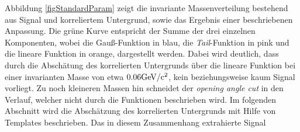 \newline
Abbildung \ref{figStandardParam} zeigt die invariante Massenverteilung bestehend aus Signal und korreliertem Untergrund, sowie das Ergebnis einer beschriebenen Anpassung.
Die gr\"une Kurve entspricht der Summe der drei einzelnen Komponenten, wobei die Gau{\ss}-Funktion in blau, die \textit{Tail}-Funktion in pink und die lineare Funktion in orange, dargestellt werden.
Dabei wird deutlich, dass durch die Absch\"atung des korrelierten Untergrunds \"uber die lineare Funktion bei einer invarianten Masse von etwa $0.06\rm{GeV}/c^{2}$, kein beziehungsweise kaum Signal vorliegt.
Zu noch kleineren Massen hin schneidet der \textit{opening angle cut} in den Verlauf, welcher nicht durch die Funktionen beschrieben wird.
\newline
Im folgenden Abschnitt wird die Absch\"atzung des korrelierten Untergrunds mit Hilfe von Templates beschrieben.
Das in diesem Zusammenhang extrahierte Signal %